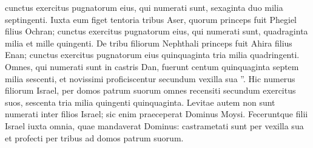\begin{biblechapter}
\begin{biblechapter}
\verse cunctus exercitus pugnatorum eius, qui numerati sunt, sexaginta duo milia septingenti. 
\verse Iuxta eum figet tentoria tribus Aser, quorum princeps fuit Phegiel filius Ochran; 
\verse cunctus exercitus pugnatorum eius, qui numerati sunt, quadraginta milia et mille quingenti. 
\verse De tribu filiorum Nephthali princeps fuit Ahira filius Enan; 
\verse cunctus exercitus pugnatorum eius quinquaginta tria milia quadringenti. 
\verse Omnes, qui numerati sunt in castris Dan, fuerunt centum quinquaginta septem milia sescenti, et novissimi proficiscentur secundum vexilla sua ”.
 \verse Hic numerus filiorum Israel, per domos patrum suorum omnes recensiti secundum exercitus suos, sescenta tria milia quingenti quinquaginta. 
\verse Levitae autem non sunt numerati inter filios Israel; sic enim praeceperat Dominus Moysi.
 \verse Feceruntque filii Israel iuxta omnia, quae mandaverat Dominus: castrametati sunt per vexilla sua et profecti per tribus ad domos patrum suorum.
 

\end{biblechapter}
\end{biblechapter}
